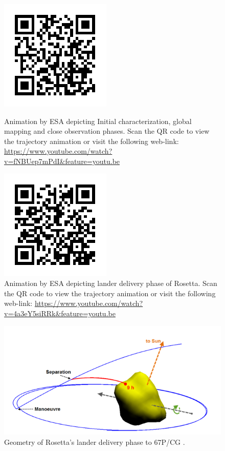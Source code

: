 \begin{figure}[htb]
\begin{minipage}[t]{0.45\linewidth}
\centering
\includegraphics[scale=0.5]{rosettatriangularorbitQR.png}
\caption{Animation by \gls{ESA} depicting Initial characterization, global mapping and close observation phases. Scan the QR code to view the trajectory animation or visit the following web-link: \url{https://www.youtube.com/watch?v=fNBUep7mPdI&feature=youtu.be}}
\label{fig:QR1}
\end{minipage}
\hspace{0.5cm}
\begin{minipage}[t]{0.45\linewidth}
\centering
\includegraphics[scale=0.5]{philaedeliveryQR.png}
\caption{Animation by \gls{ESA} depicting lander delivery phase of Rosetta. Scan the QR code to view the trajectory animation or visit the following web-link: \url{https://www.youtube.com/watch?v=4a3eY5siRRk&feature=youtu.be}}
\label{fig:philaedeliveryQR}
\end{minipage}
\end{figure}
\FloatBarrier

\begin{figure}[h]
\centering
\captionsetup{justification=centering}
\includegraphics[scale=0.9]{rosettalandertraj.png}
\caption{Geometry of Rosetta's lander delivery phase to 67P/CG \cite{rosettanew2012}.}
\label{fig:rosettalandertraj}
\end{figure}

